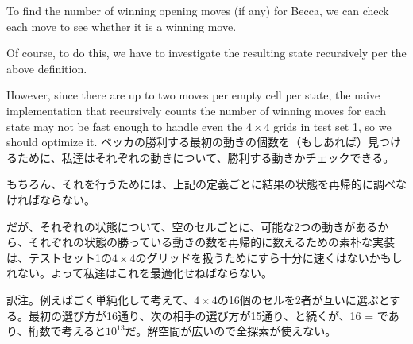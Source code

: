 \documentclass[uplatex,dvipdfmx]{jsarticle} \usepackage{amsmath,amssymb,bm}
\begin{document}
\begin{paracol}{2}
To find the number of winning opening moves (if any) for Becca, we can check each move to see whether it is a winning move.

Of course, to do this, we have to investigate the resulting state recursively per the above definition.

However, since there are up to two moves per empty cell per state, the naive implementation that recursively counts the number of winning moves for each state may not be fast enough to handle even the $4\times 4$ grids in test set 1, so we should optimize it.
\switchcolumn
ベッカの勝利する最初の動きの個数を（もしあれば）見つけるために、私達はそれぞれの動きについて、勝利する動きかチェックできる。

もちろん、それを行うためには、上記の定義ごとに結果の状態を再帰的に調べなければならない。

だが、それぞれの状態について、空のセルごとに、可能な2つの動きがあるから、それぞれの状態の勝っている動きの数を再帰的に数えるための素朴な実装は、テストセット1の$4\times 4$のグリッドを扱うためにすら十分に速くはないかもしれない。よって私達はこれを最適化せねばならない。
\end{paracol}
\vspace{\baselineskip}
訳注。例えばごく単純化して考えて、$4\times 4$の16個のセルを2者が互いに選ぶとする。最初の選び方が16通り、次の相手の選び方が15通り、と続くが、16 = であり、桁数で考えると$10^{13}$だ。解空間が広いので全探索が使えない。
\vspace{\baselineskip}
\end{document}
